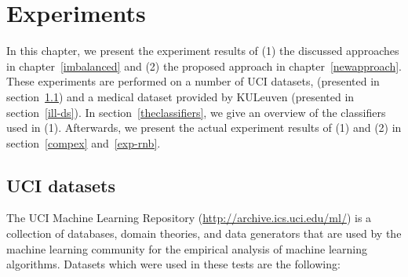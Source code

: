 
\chapter{Experiments}\label{Experiments}
In this chapter, we present the experiment results of (1) the discussed approaches in chapter~\ref{imbalanced} and (2) the proposed approach in chapter~\ref{newapproach}. These experiments are performed on a number of UCI datasets, (presented in section~\ref{uci-ds}) and a medical dataset provided by KULeuven (presented in section~\ref{ill-ds}). In section~\ref{theclassifiers}, we give an overview of the classifiers used in (1).  Afterwards, we present the actual experiment results of (1) and (2) in section~\ref{compex} and~\ref{exp-rnb}.

\section{UCI datasets}\label{uci-ds}
The UCI Machine Learning Repository (\url{http://archive.ics.uci.edu/ml/}) is a collection of databases, domain theories, and data generators that are used by the machine learning community for the empirical analysis of machine learning algorithms. Datasets which were used in these tests are the following:

